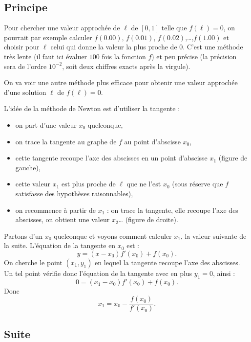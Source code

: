 \documentclass[11pt,class=report,crop=false]{standalone}
\begin{document}
\subsection{Principe}

Pour chercher une valeur approchée de $\ell$ de $[0,1]$ telle que $f(\ell)=0$,  on pourrait par exemple calculer $f(0.00)$, $f(0.01)$, $f(0.02)$,\ldots,$f(1.00)$ et choisir pour $\ell$ celui qui donne la valeur la plus proche de $0$. C'est une méthode très lente (il faut ici évaluer $100$ fois la fonction $f$) et peu précise (la précision sera de l'ordre $10^{-2}$, soit deux chiffres exacts après la virgule).

On va voir une autre méthode plus efficace pour obtenir une valeur approchée d'une solution $\ell$ de $f(\ell)=0$.


L'idée de la méthode de Newton est d'utiliser la tangente :
\begin{itemize} 
  \item on part d'une valeur $x_0$ quelconque,
  \item on trace la tangente au graphe de $f$ au point d'abscisse $x_0$,
  \item cette tangente recoupe l'axe des abscisses en un point d'abscisse $x_1$ (figure de gauche),
  \item cette valeur $x_1$ est plus proche de $\ell$ que ne l'est $x_0$ (sous réserve que $f$ satisfasse des hypothèses raisonnables),
  \item on recommence à partir de $x_1$ : on trace la tangente, elle recoupe l'axe des abscisses, on obtient une valeur $x_2$\ldots{} (figure de droite).
\end{itemize}
  
  
Partons d'un $x_0$ quelconque et voyons comment calculer $x_1$, la valeur suivante de la suite. L'équation de la tangente en $x_0$ est :
$$y = (x-x_0) f'(x_0) + f(x_0).$$
On cherche le point $(x_1,y_1)$ en lequel la tangente recoupe l'axe des abscisses. Un tel point vérifie donc l'équation de la tangente avec en plus $y_1=0$, ainsi :
$$0 = (x_1-x_0) f'(x_0) + f(x_0).$$
Donc 
$$x_1 = x_0 - \frac{f(x_0)}{f'(x_0)}.$$

  
\subsection{Suite}
  
\end{document}
